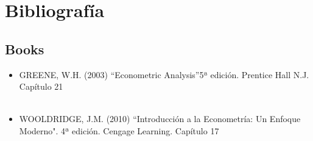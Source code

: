 \documentclass[11pt,fleqn]{book} %
\numberwithin{equation}{section} %
\numberwithin{figure}{section} %
\numberwithin{table}{section} %
\begin{document}





\chapter*{Bibliografía}
\section*{Books}
\printbibliography[heading=bibempty,type=book]

\begin{itemize}
	\item GREENE, W.H. (2003) “Econometric Analysis”5ª edición. Prentice Hall N.J. Capítulo 21
\\\\
    \item WOOLDRIDGE, J.M. (2010) “Introducción a la Econometría: Un Enfoque Moderno". 4ª edición. Cengage Learning. Capítulo 17

\end{itemize}



\cleardoublepage
{}
\setlength{\columnsep}{0.75cm}
\printindex

\end{document}
